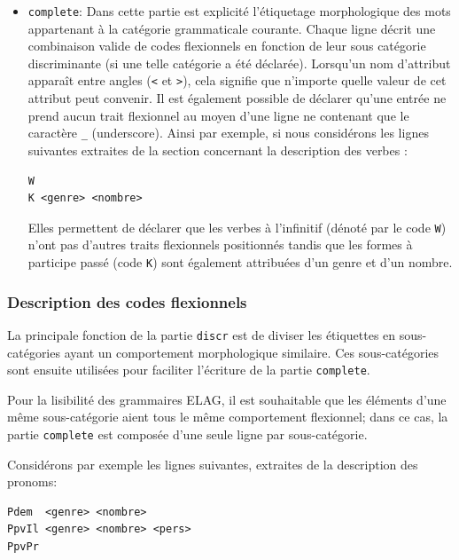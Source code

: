 \begin{itemize}
\item \verb$complete$: Dans cette partie est explicité l’étiquetage
morphologique des mots appartenant à la catégorie grammaticale courante. Chaque ligne décrit
une combinaison valide de codes flexionnels en fonction de leur sous catégorie discriminante
(si une telle catégorie a été déclarée). Lorsqu’un nom d’attribut apparaît entre angles
(\verb$<$ et \verb$>$), cela signifie que n’importe quelle valeur de cet attribut peut convenir.
 Il est également possible de déclarer qu’une entrée ne prend aucun trait flexionnel au moyen d’une
 ligne ne contenant que le caractère \verb$_$ (underscore).\index{\verb$_$} Ainsi par exemple, si
 nous considérons les lignes suivantes extraites de la section concernant la description des verbes :



\begin{verbatim}
W
K <genre> <nombre>
\end{verbatim}

Elles permettent de déclarer que les verbes à l’infinitif (dénoté par le code
\verb$W$) n’ont pas d’autres traits flexionnels positionnés tandis que les formes
à participe passé (code \verb$K$) sont également attribuées d’un genre et d’un nombre.

\end{itemize}

\subsubsection{Description des codes flexionnels}
La principale fonction de la partie \verb$discr$ est de diviser les étiquettes en sous-catégories
ayant un comportement morphologique similaire. Ces sous-catégories sont ensuite utilisées
pour faciliter l’écriture de la partie \verb$complete$.

\bigskip
\noindent Pour la lisibilité des grammaires ELAG, il est souhaitable que les éléments d’une même
sous-catégorie aient tous le même comportement flexionnel; dans ce cas, la partie \verb$complete$ 
est composée d’une seule ligne par sous-catégorie.

Considérons par exemple les lignes suivantes, extraites de la description des pronoms:

\begin{verbatim}
Pdem  <genre> <nombre>
PpvIl <genre> <nombre> <pers>
PpvPr
\end{verbatim}

